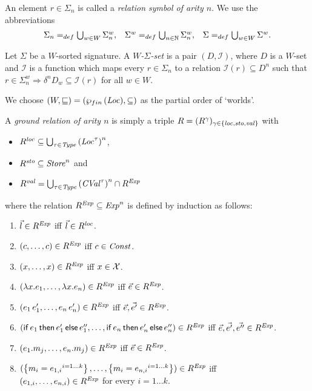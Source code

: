 \documentclass[12pt,a4paper]{report}
\newcommand{\CVal}{\nstyle{CVal}}
\newcommand{\loc}{\nstyle{loc}}
\newcommand{\sto}{\nstyle{sto}}
\newcommand{\val}{\nstyle{val}}
\newcommand{\I}{\mathcal{I}}
\begin{document}
An element $r \in \Sigma_n$ is called a {\em relation symbol of arity $n$}. We use the abbreviations
\[\begin{array}{rcl}
  \Sigma_n =_{def} \bigcup_{w\in W} \Sigma^w_n, &
  \Sigma^w =_{def} \bigcup_{n\in \mathbb N} \Sigma^w_n, &
  \Sigma =_{def} \bigcup_{w\in W} \Sigma^w.
\end{array}\]

\begin{definition}
  Let $\Sigma$ be a $W$-sorted signature. A {\em $W$-$\Sigma$-set} is a pair
  $(D,\I)$, where $D$ is a $W$-set and $\I$ is a function which maps every
  $r \in \Sigma_n$ to a relation $\I(r) \subseteq D^n$ such that
  $r \in \Sigma^w_n \Rightarrow \delta^n D_w \subseteq \I(r)$ for all $w \in W$.
\end{definition}

We choose $(W,\sqsubseteq) = (\wp_{fin}\,(\mathit{Loc}),\subseteq)$ as the partial order of `worlds'.

\begin{definition}
  A {\em ground relation of arity $n$} is simply a triple $R = (R^\gamma)_{\gamma\in\{\loc,\sto,\val\}}$ with
  \begin{itemize}
    \item $R^\loc \subseteq \bigcup_{\tau\in\Type} \left(\Loc^\tau\right)^n$,
    \item $R^\sto \subseteq \Store^n$ and
    \item $R^\val = \bigcup_{\tau\in\Type} \left(\CVal^\tau\right)^n \cap R^\Exp$
  \end{itemize}
  where the relation $R^{\mathit{Exp}} \subseteq \mathit{Exp}^n$ is defined by induction as follows:
  \begin{enumerate}
    \item $\vec{l}\in R^{\mathit{Exp}}$ iff $\vec{l}\in R^\loc$.
    \item $(c,\ldots,c)\in R^{\mathit{Exp}}$ iff $c\in\mathit{Const}$.
    \item $(x,\ldots,x)\in R^{\mathit{Exp}}$ iff $x\in\mathcal{X}$.
    \item $(\lambda x.e_1,\ldots,\lambda x.e_n)\in R^{\mathit{Exp}}$ iff $\vec{e}\in R^{\mathit{Exp}}$.
    \item $(e_1\,e_1',\ldots,e_n\,e_n')\in R^{\mathit{Exp}}$ iff $\vec{e},\vec{e'}\in R^{\mathit{Exp}}$.
    \item $(\mathsf{if}\,e_1\,\mathsf{then}\,e_1'\,\mathsf{else}\,e_1'',\ldots,\mathsf{if}\,e_n\,\mathsf{then}\,e_n'\,\mathsf{else}\,e_n'')\in R^{\mathit{Exp}}$ iff
          $\vec{e},\vec{e'},\vec{e''}\in R^{\mathit{Exp}}$.
    \item $(e_1.m_j,\ldots,e_n.m_j)\in R^{\mathit{Exp}}$ iff $\vec{e}\in R^{\mathit{Exp}}$.
    \item $(\left\{{m_i=e_{1,i}}^{i=1 \ldots k}\right\},\ldots,\left\{{m_i=e_{n,i}}^{i=1 \ldots k}\right\})\in R^{\mathit{Exp}}$ iff \\
            $(e_{1,i},\ldots,e_{n,i})\in R^{\mathit{Exp}}$ for every $i=1 \ldots k$.
  \end{enumerate}
\end{definition}
\end{document}
